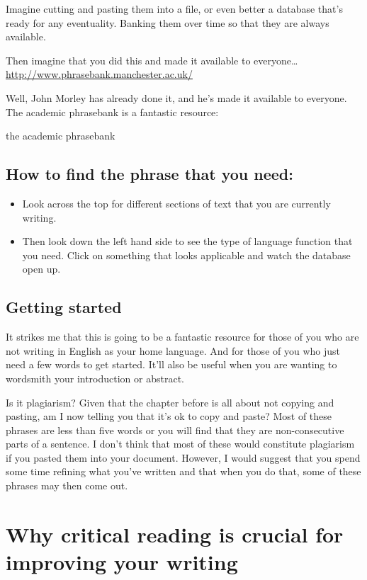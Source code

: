 \documentclass[
]{krantz}
\providecommand{\tightlist}{%
  \setlength{\itemsep}{0pt}\setlength{\parskip}{0pt}}
\begin{document}
Imagine cutting and pasting them into a file, or even better a database that's ready for any eventuality. Banking them over time so that they are always available.

Then imagine that you did this and made it available to everyone\ldots{}
\url{http://www.phrasebank.manchester.ac.uk/}

Well, John Morley has already done it, and he's made it available to everyone. The academic phrasebank is a fantastic resource:

the academic phrasebank

\hypertarget{how-to-find-the-phrase-that-you-need}{%
\subsection{How to find the phrase that you need:}\label{how-to-find-the-phrase-that-you-need}}

\begin{itemize}
\tightlist
\item
  Look across the top for different sections of text that you are currently writing.
\item
  Then look down the left hand side to see the type of language function that you need. Click on something that looks applicable and watch the database open up.
\end{itemize}

\hypertarget{getting-started}{%
\subsection{Getting started}\label{getting-started}}

It strikes me that this is going to be a fantastic resource for those of you who are not writing in English as your home language. And for those of you who just need a few words to get started. It'll also be useful when you are wanting to wordsmith your introduction or abstract.

Is it plagiarism? Given that the chapter before is all about not copying and pasting, am I now telling you that it's ok to copy and paste? Most of these phrases are less than five words or you will find that they are non-consecutive parts of a sentence. I don't think that most of these would constitute plagiarism if you pasted them into your document. However, I would suggest that you spend some time refining what you've written and that when you do that, some of these phrases may then come out.

\hypertarget{critical}{%
\section{Why critical reading is crucial for improving your writing}\label{critical}}
\end{document}
